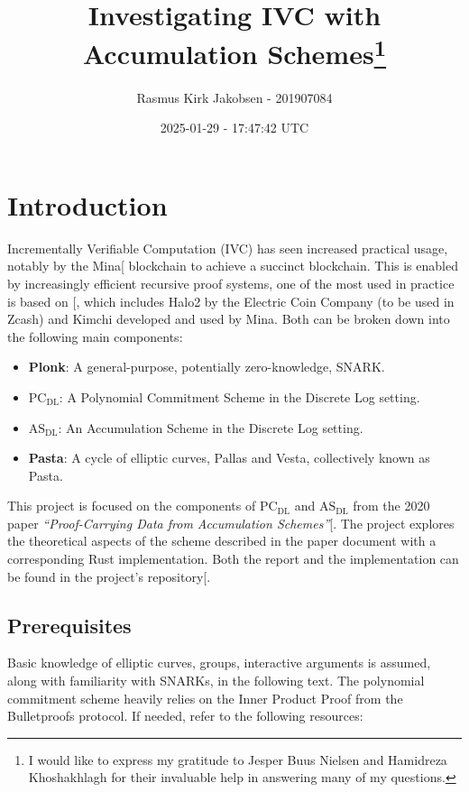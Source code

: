 \documentclass[
]{article}
\title{Investigating IVC with Accumulation Schemes\thanks{I would like
to express my gratitude to Jesper Buus Nielsen and Hamidreza
Khoshakhlagh for their invaluable help in answering many of my
questions.}}
\author{Rasmus Kirk Jakobsen - 201907084}
\date{2025-01-29 - 17:47:42 UTC}
\providecommand{\tightlist}{%
  \setlength{\itemsep}{0pt}\setlength{\parskip}{0pt}}
\newcommand*{\PCDL}{\text{PC}_{\text{DL}}}
\newcommand*{\ASDL}{\text{AS}_{\text{DL}}}
\begin{document}
\maketitle

{
\hypersetup{linkcolor=black}
\setcounter{tocdepth}{3}
\tableofcontents
}
\section{Introduction}\label{introduction}

Incrementally Verifiable Computation (IVC) has seen increased practical
usage, notably by the Mina{[}\citeproc{ref-mina}{2025}{]} blockchain to
achieve a succinct blockchain. This is enabled by increasingly efficient
recursive proof systems, one of the most used in practice is based on
{[}\citeproc{ref-halo}{Bowe et al. 2019}{]}, which includes Halo2 by the
Electric Coin Company (to be used in Zcash) and Kimchi developed and
used by Mina. Both can be broken down into the following main
components:

\begin{itemize}
\tightlist
\item
  \textbf{Plonk}: A general-purpose, potentially zero-knowledge, SNARK.
\item
  \textbf{\(\PCDL\)}: A Polynomial Commitment Scheme in the Discrete Log
  setting.
\item
  \textbf{\(\ASDL\)}: An Accumulation Scheme in the Discrete Log
  setting.
\item
  \textbf{Pasta}: A cycle of elliptic curves, Pallas and Vesta,
  collectively known as Pasta.
\end{itemize}

This project is focused on the components of \(\PCDL\) and \(\ASDL\)
from the 2020 paper \emph{``Proof-Carrying Data from Accumulation
Schemes''}{[}\citeproc{ref-pcd}{Bünz et al. 2020}{]}. The project
explores the theoretical aspects of the scheme described in the paper
document with a corresponding Rust implementation. Both the report and
the implementation can be found in the project's
repository{[}\citeproc{ref-repo}{Jakobsen 2025}{]}.

\subsection{Prerequisites}\label{prerequisites}

Basic knowledge of elliptic curves, groups, interactive arguments is
assumed, along with familiarity with SNARKs, in the following text. The
polynomial commitment scheme heavily relies on the Inner Product Proof
from the Bulletproofs protocol. If needed, refer to the following
resources:
\end{document}
